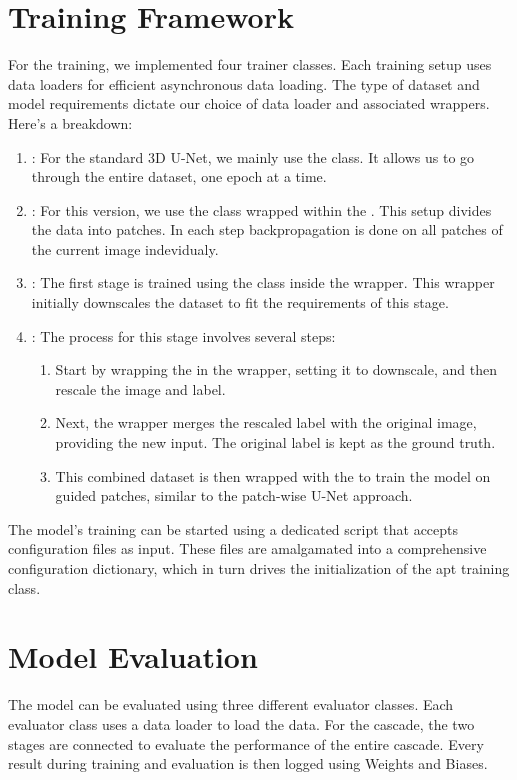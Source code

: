 \section{Training Framework}
For the training, we implemented four trainer classes. Each training setup uses data loaders for efficient asynchronous data loading.
The type of dataset and model requirements dictate our choice of data loader and associated wrappers. Here's a breakdown:

\begin{enumerate}
	\item {}: For the standard $3$D U-Net, we mainly use the  class. It allows us to go through the entire dataset, one epoch at a time.
	\item {}: For this version, we use the  class wrapped within the . This setup divides the data into patches.
	In each step backpropagation is done on all patches of the current image indevidualy.
	\item {}: The first stage is trained using the  class inside the  wrapper. This wrapper initially downscales the dataset to fit the requirements of this stage.
	\item {}: The process for this stage involves several steps:
	\begin{enumerate}
		\item Start by wrapping the  in the   wrapper, setting it to downscale, and then rescale the image and label.
        \item Next, the  wrapper merges the rescaled label with the original image, providing the new input. The original label is kept as the ground truth.
		\item This combined dataset is then wrapped with the  to train the model on guided patches, similar to the patch-wise U-Net approach.
	\end{enumerate}
\end{enumerate}

\noindent The model's training can be started using a dedicated script that accepts configuration files as input. These files are amalgamated into a comprehensive configuration dictionary,
which in turn drives the initialization of the apt training class.\\[1ex]
\section{Model Evaluation}
The model can be evaluated using three different evaluator classes. Each evaluator class uses a data loader to load the data. For the cascade,
the two stages are connected to evaluate the performance of the entire cascade. Every result during training and evaluation is then logged using Weights and Biases.

